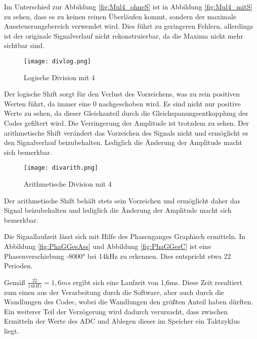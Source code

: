 Im Unterschied zur Abbildung \ref{fig:Mul4_ohneS} ist in Abbildung \ref{fig:Mul4_mitS} zu sehen, dass es zu keinen reinen Überläufen kommt, sondern der maximale Aussteuerungsbereich verwendet wird.
Dies führt zu geringeren Fehlern, allerdings ist der originale Signalverlauf nicht rekonstruierbar, da die Maxima nicht mehr sichtbar sind.
\begin{figure}[b!]
  \centering
    \texttt{[image: divlog.png]}
  \caption{Logische Division mit 4}
  \label{fig:divlog}
\end{figure}
Der  logische  Shift  sorgt  f\"ur  den  Verlust  des  Vorzeichens,  was  zu  rein  positiven  Werten
f\"uhrt, da immer eine 0 nachgeschoben wird. 
Es sind nicht nur positive Werte zu sehen, da dieser Gleichanteil durch die Gleichspanungsentkopplung des Codes gefiltert wird.
Die Verringerung der Amplitude ist trotzdem zu sehen. 
Der arithmetische Shift verändert das Vorzeichen des Signals nicht und ermöglicht es den Signalverlauf beizubehalten. 
Lediglich die \"Anderung der Amplitude macht sich bemerkbar.
\begin{figure}[h!]
  \centering
    \texttt{[image: divarith.png]}
  \caption{Arithmetische Division mit 4}
  \label{fig:divarith}
\end{figure}

Der arithmetische Shift behält stets sein Vorzeichen und ermöglicht daher das Signal beizubehalten und lediglich die \"Anderung der Amplitude macht sich 
bemerkbar.\\\par \pagebreak
Die Signallaufzeit lässt sich mit Hilfe des Phasenganges Graphisch ermitteln. 
In Abbildung \ref{fig:PhaGGesAss} und Abbildung \ref{fig:PhaGGesC} ist eine Phasenverschiebung -8000° bei 14kHz zu erkennen. Dies entspricht etwa 22 
Perioden.\\\par
Gemäß \begin{math}\frac{22}{14kHz} = 1,6ms\end{math} ergibt sich eine Laufzeit von 1,6ms. 
Diese Zeit resultiert zum einen aus der Verarbeitung durch die Software, aber auch durch die Wandlungen des Codec, wobei die Wandlungen den größten Anteil haben dürften. 
Ein weiterer Teil der Verzögerung wird dadurch verursacht, dass zwischen Ermitteln der Werte des ADC und Ablegen dieser im Speicher ein Taktzyklus liegt.

